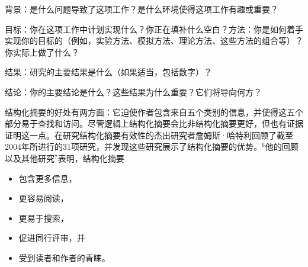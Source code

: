 背景：是什么问题导致了这项工作？是什么环境使得这项工作有趣或重要？

目标：你在这项工作中计划实现什么？你正在填补什么空白？方法：你是如何着手实现你的目标的（例如，实验方法、模拟方法、理论方法、这些方法的组合等）？你实际上做了什么？

结果：研究的主要结果是什么（如果适当，包括数字）？

结论：你的主要结论是什么？这些结果为什么重要？它们将导向何方？

结构化摘要的好处有两方面：它迫使作者包含来自五个类别的信息，并使得这五个部分易于查找和访问。尽管逻辑上结构化摘要会比非结构化摘要更好，但也有证据证明这一点。在研究结构化摘要有效性的杰出研究者詹姆斯·哈特利回顾了截至2004年所进行的31项研究，并发现这些研究展示了结构化摘要的优势。${ }^{6}$他的回顾以及其他研究${ }^{7}$表明，结构化摘要

\begin{itemize}
\item 包含更多信息，
\item 更容易阅读，
\item 更易于搜索，
\item 促进同行评审，并
\item 受到读者和作者的青睐。
\end{itemize}

